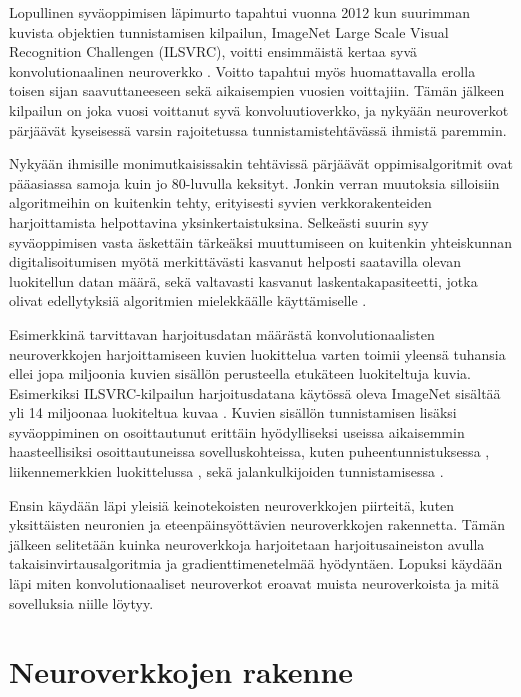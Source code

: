 \documentclass[finnish]{tktltiki2}
\theoremstyle{definition}
\theoremstyle{remark}
\begin{document}
  Lopullinen syväoppimisen läpimurto tapahtui vuonna 2012 kun suurimman kuvista objektien tunnistamisen kilpailun, ImageNet Large Scale Visual Recognition Challengen (ILSVRC), voitti ensimmäistä kertaa syvä konvolutionaalinen neuroverkko \cite{KSHimagenet2012}. Voitto tapahtui myös huomattavalla erolla toisen sijan saavuttaneeseen sekä aikaisempien vuosien voittajiin. Tämän jälkeen kilpailun on joka vuosi voittanut syvä konvoluutioverkko, ja nykyään neuroverkot pärjäävät kyseisessä varsin rajoitetussa tunnistamistehtävässä ihmistä paremmin.

  Nykyään ihmisille monimutkaisissakin tehtävissä pärjäävät oppimisalgoritmit ovat pääasiassa samoja kuin jo 80-luvulla keksityt. Jonkin verran muutoksia silloisiin algoritmeihin on kuitenkin tehty, erityisesti syvien verkkorakenteiden harjoittamista helpottavina yksinkertaistuksina. Selkeästi suurin syy syväoppimisen vasta äskettäin tärkeäksi muuttumiseen on kuitenkin yhteiskunnan digitalisoitumisen myötä merkittävästi kasvanut helposti saatavilla olevan luokitellun datan määrä, sekä valtavasti kasvanut laskentakapasiteetti, jotka olivat edellytyksiä algoritmien mielekkäälle käyttämiselle \cite{Goodfellow-et-al-2016}.

  Esimerkkinä tarvittavan harjoitusdatan määrästä konvolutionaalisten neuroverkkojen harjoittamiseen kuvien luokittelua varten toimii yleensä tuhansia ellei jopa miljoonia kuvien sisällön perusteella etukäteen luokiteltuja kuvia. Esimerkiksi ILSVRC-kilpailun harjoitusdatana käytössä oleva ImageNet sisältää yli 14 miljoonaa luokiteltua kuvaa \cite{imagenet-website}. Kuvien sisällön tunnistamisen lisäksi syväoppiminen on osoittautunut erittäin hyödylliseksi useissa aikaisemmin haasteellisiksi osoittautuneissa sovelluskohteissa, kuten puheentunnistuksessa \cite{abdel2012applying}, liikennemerkkien luokittelussa \cite{sermanet2011traffic}, sekä jalankulkijoiden tunnistamisessa \cite{szarvas2005pedestrian} .

  Ensin käydään läpi yleisiä keinotekoisten neuroverkkojen piirteitä, kuten yksittäisten neuronien ja eteenpäinsyöttävien neuroverkkojen rakennetta. Tämän jälkeen selitetään kuinka neuroverkkoja harjoitetaan harjoitusaineiston avulla takaisinvirtausalgoritmia ja gradienttimenetelmää hyödyntäen. Lopuksi käydään läpi miten konvolutionaaliset neuroverkot eroavat muista neuroverkoista ja mitä sovelluksia niille löytyy.

  \section{Neuroverkkojen rakenne}
\end{document}
